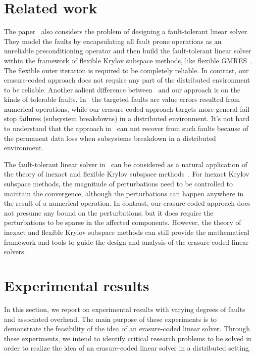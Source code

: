 \documentclass[11pt]{article}
\begin{document}
\section{Related work}

The paper~\cite{BridgesFHH:2012} also considers the problem of designing a fault-tolerant
linear solver. They model the faults by encapsulating all fault prone operations as an
unreliable preconditioning operator and then build the fault-tolerant linear solver within
the framework of flexible Krylov subspace methods, like flexible GMRES~\cite{Saad:1993}.
The flexible outer iteration is required to be completely reliable. In contrast,
our erasure-coded approach does not require any part of the distributed environment
to be reliable. Another salient difference between~\cite{BridgesFHH:2012} and our
approach is on the kinds of tolerable faults. In~\cite{BridgesFHH:2012} the targeted
faults are value errors resulted from numerical operations, while our erasure-coded
approach targets more general fail-stop failures (subsystem breakdowns) in a distributed
environment. It's not hard to understand that the approach in~\cite{BridgesFHH:2012}
can not recover from such faults because of the permanent data loss when subsystems
breakdown in a distributed environment.
\par
The fault-tolerant linear solver in~\cite{BridgesFHH:2012} can be considered as a
natural application of the theory of inexact and flexible Krylov subspace
methods~\cite{EshofS:2004,SimonciniS:2003a,SimonciniS:2003b}. For inexact Krylov
subspace methods, the magnitude of perturbations need to be controlled to
maintain the convergence, although the perturbations can happen anywhere in the
result of a numerical operation. In contrast, our erasure-coded approach does not
presume any bound on the perturbations; but it does require the perturbations to
be sparse in the affected components. However, the theory of inexact and flexible
Krylov subspace methods can still provide the mathematical framework and tools to
guide the design and analysis of the erasure-coded linear solvers.


\section{Experimental results} \label{sec:experiments}

In this section, we report on experimental results with varying degrees of faults
and associated overhead. The main purpose of these experiments is to demonstrate the
feasibility of the idea of an erasure-coded linear solver. Through these experiments,
we intend to identify critical research problems to be solved in order to realize
the idea of an erasure-coded linear solver in a distributed setting.
\end{document}

